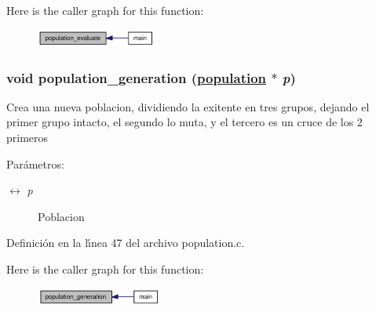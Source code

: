 Here is the caller graph for this function:\begin{figure}[H]
\begin{center}
\leavevmode
\includegraphics[width=112pt]{group__genetic_g229293c432c5ef4f70b1ee94c109bb1a_g229293c432c5ef4f70b1ee94c109bb1a_icgraph}
\end{center}
\end{figure}
\hypertarget{group__genetic_g5b3202f02e14d7fb3eb1f729d1250243_g5b3202f02e14d7fb3eb1f729d1250243}{
\subsubsection[population\_\-generation]{\setlength{\rightskip}{0pt plus 5cm}void population\_\-generation (\hyperlink{struct__population}{population} $\ast$ {\em p})}}
\label{group__genetic_g5b3202f02e14d7fb3eb1f729d1250243_g5b3202f02e14d7fb3eb1f729d1250243}


Crea una nueva poblacion, dividiendo la exitente en tres grupos, dejando el primer grupo intacto, el segundo lo muta, y el tercero es un cruce de los 2 primeros \begin{Desc}
\item[Par\'{a}metros:]
\begin{description}
\item[\mbox{$\leftrightarrow$} {\em p}]Poblacion \end{description}
\end{Desc}


Definici\'{o}n en la l\'{\i}nea 47 del archivo population.c.

Here is the caller graph for this function:\begin{figure}[H]
\begin{center}
\leavevmode
\includegraphics[width=117pt]{group__genetic_g5b3202f02e14d7fb3eb1f729d1250243_g5b3202f02e14d7fb3eb1f729d1250243_icgraph}
\end{center}
\end{figure}
